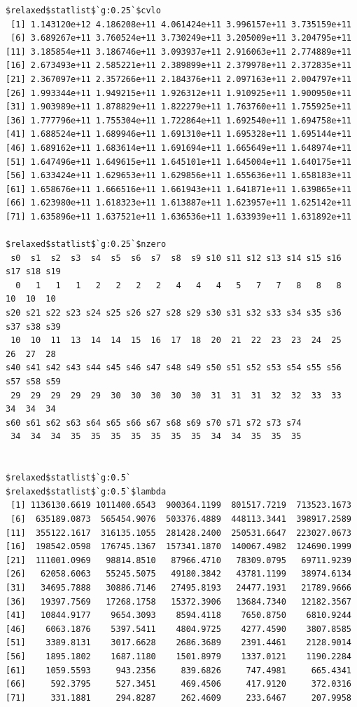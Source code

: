 \documentclass[
]{article}
\begin{document}
\begin{verbatim}
$relaxed$statlist$`g:0.25`$cvlo
 [1] 1.143120e+12 4.186208e+11 4.061424e+11 3.996157e+11 3.735159e+11
 [6] 3.689267e+11 3.760524e+11 3.730249e+11 3.205009e+11 3.204795e+11
[11] 3.185854e+11 3.186746e+11 3.093937e+11 2.916063e+11 2.774889e+11
[16] 2.673493e+11 2.585221e+11 2.389899e+11 2.379978e+11 2.372835e+11
[21] 2.367097e+11 2.357266e+11 2.184376e+11 2.097163e+11 2.004797e+11
[26] 1.993344e+11 1.949215e+11 1.926312e+11 1.910925e+11 1.900950e+11
[31] 1.903989e+11 1.878829e+11 1.822279e+11 1.763760e+11 1.755925e+11
[36] 1.777796e+11 1.755304e+11 1.722864e+11 1.692540e+11 1.694758e+11
[41] 1.688524e+11 1.689946e+11 1.691310e+11 1.695328e+11 1.695144e+11
[46] 1.689162e+11 1.683614e+11 1.691694e+11 1.665649e+11 1.648974e+11
[51] 1.647496e+11 1.649615e+11 1.645101e+11 1.645004e+11 1.640175e+11
[56] 1.633424e+11 1.629653e+11 1.629856e+11 1.655636e+11 1.658183e+11
[61] 1.658676e+11 1.666516e+11 1.661943e+11 1.641871e+11 1.639865e+11
[66] 1.623980e+11 1.618323e+11 1.613887e+11 1.623957e+11 1.625142e+11
[71] 1.635896e+11 1.637521e+11 1.636536e+11 1.633939e+11 1.631892e+11

$relaxed$statlist$`g:0.25`$nzero
 s0  s1  s2  s3  s4  s5  s6  s7  s8  s9 s10 s11 s12 s13 s14 s15 s16 s17 s18 s19 
  0   1   1   1   2   2   2   2   4   4   4   5   7   7   8   8   8  10  10  10 
s20 s21 s22 s23 s24 s25 s26 s27 s28 s29 s30 s31 s32 s33 s34 s35 s36 s37 s38 s39 
 10  10  11  13  14  14  15  16  17  18  20  21  22  23  23  24  25  26  27  28 
s40 s41 s42 s43 s44 s45 s46 s47 s48 s49 s50 s51 s52 s53 s54 s55 s56 s57 s58 s59 
 29  29  29  29  29  30  30  30  30  30  31  31  31  32  32  33  33  34  34  34 
s60 s61 s62 s63 s64 s65 s66 s67 s68 s69 s70 s71 s72 s73 s74 
 34  34  34  35  35  35  35  35  35  35  34  34  35  35  35 


$relaxed$statlist$`g:0.5`
$relaxed$statlist$`g:0.5`$lambda
 [1] 1136130.6619 1011400.6543  900364.1199  801517.7219  713523.1673
 [6]  635189.0873  565454.9076  503376.4889  448113.3441  398917.2589
[11]  355122.1617  316135.1055  281428.2400  250531.6647  223027.0673
[16]  198542.0598  176745.1367  157341.1870  140067.4982  124690.1999
[21]  111001.0969   98814.8510   87966.4710   78309.0795   69711.9239
[26]   62058.6063   55245.5075   49180.3842   43781.1199   38974.6134
[31]   34695.7888   30886.7146   27495.8193   24477.1931   21789.9666
[36]   19397.7569   17268.1758   15372.3906   13684.7340   12182.3567
[41]   10844.9177    9654.3093    8594.4118    7650.8750    6810.9244
[46]    6063.1876    5397.5411    4804.9725    4277.4590    3807.8585
[51]    3389.8131    3017.6628    2686.3689    2391.4461    2128.9014
[56]    1895.1802    1687.1180    1501.8979    1337.0121    1190.2284
[61]    1059.5593     943.2356     839.6826     747.4981     665.4341
[66]     592.3795     527.3451     469.4506     417.9120     372.0316
[71]     331.1881     294.8287     262.4609     233.6467     207.9958


\end{verbatim}
\end{document}
